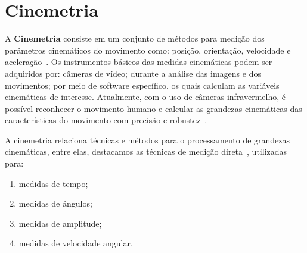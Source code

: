 \section{Cinemetria}
A \textbf{Cinemetria} consiste em um conjunto de métodos para medição dos parâmetros cinemáticos do movimento como: posição, orientação, velocidade e aceleração~\cite{biomecanica99}. Os instrumentos básicos das medidas cinemáticas podem ser adquiridos por: câmeras de vídeo; durante a análise das imagens e dos movimentos; por meio de software específico, os quais calculam as variáveis cinemáticas de interesse. Atualmente, com o uso de câmeras infravermelho, é possível reconhecer o movimento humano e calcular as grandezas cinemáticas das características do movimento com precisão e robustez~\cite{gabel2012}.

A cinemetria relaciona técnicas e métodos para o processamento de grandezas cinemáticas, entre elas, destacamos as técnicas de medição direta~\cite{biomecanica99}, utilizadas para: 
\begin{enumerate}
	\item medidas de tempo;
	\item medidas de ângulos;
	\item medidas de amplitude;
	\item medidas de velocidade angular.
\end{enumerate}

% 


